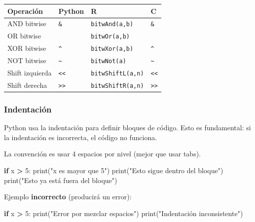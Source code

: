 \documentclass[
]{book}
\newenvironment{Shaded}{\begin{snugshade}}{\end{snugshade}}
\newcommand{\BuiltInTok}[1]{#1}
\newcommand{\ControlFlowTok}[1]{\textcolor[rgb]{0.13,0.29,0.53}{\textbf{#1}}}
\newcommand{\DecValTok}[1]{\textcolor[rgb]{0.00,0.00,0.81}{#1}}
\newcommand{\NormalTok}[1]{#1}
\newcommand{\OperatorTok}[1]{\textcolor[rgb]{0.81,0.36,0.00}{\textbf{#1}}}
\newcommand{\StringTok}[1]{\textcolor[rgb]{0.31,0.60,0.02}{#1}}
\newcounter{none} %
\theoremstyle{break}
\theoremstyle{nonumberplain}
\begin{document}
{\def\LTcaptype{none} %
\begin{longtable}[]{@{}llll@{}}
\toprule\noalign{}
Operación & Python & R & C \\
\midrule\noalign{}
\endhead
\bottomrule\noalign{}
\endlastfoot
AND bitwise & \texttt{\&} & \texttt{bitwAnd(a,b)} & \texttt{\&} \\
OR bitwise & \texttt{\textbar{}} & \texttt{bitwOr(a,b)} & \texttt{\textbar{}} \\
XOR bitwise & \texttt{\^{}} & \texttt{bitwXor(a,b)} & \texttt{\^{}} \\
NOT bitwise & \texttt{\textasciitilde{}} & \texttt{bitwNot(a)} & \texttt{\textasciitilde{}} \\
Shift izquierda & \texttt{\textless{}\textless{}} & \texttt{bitwShiftL(a,n)} & \texttt{\textless{}\textless{}} \\
Shift derecha & \texttt{\textgreater{}\textgreater{}} & \texttt{bitwShiftR(a,n)} & \texttt{\textgreater{}\textgreater{}} \\
\end{longtable}
}

\subsubsection{Indentación}\label{indentaciuxf3n}

Python usa la indentación para definir bloques de código.
Esto es fundamental: si la indentación es incorrecta, el código no funciona.

La convención es usar 4 espacios por nivel (mejor que usar tabs).

\begin{Shaded}
\begin{Highlighting}[]
\ControlFlowTok{if}\NormalTok{ x }\OperatorTok{\textgreater{}} \DecValTok{5}\NormalTok{:}
    \BuiltInTok{print}\NormalTok{(}\StringTok{"x es mayor que 5"}\NormalTok{)}
    \BuiltInTok{print}\NormalTok{(}\StringTok{"Esto sigue dentro del bloque"}\NormalTok{)}
\BuiltInTok{print}\NormalTok{(}\StringTok{"Esto ya está fuera del bloque"}\NormalTok{)}
\end{Highlighting}
\end{Shaded}

Ejemplo \textbf{incorrecto} (producirá un error):

\begin{Shaded}
\begin{Highlighting}[]
\ControlFlowTok{if}\NormalTok{ x }\OperatorTok{\textgreater{}} \DecValTok{5}\NormalTok{:}
  \BuiltInTok{print}\NormalTok{(}\StringTok{"Error por mezclar espacios"}\NormalTok{)}
    \BuiltInTok{print}\NormalTok{(}\StringTok{"Indentación inconsistente"}\NormalTok{)}
\end{Highlighting}
\end{Shaded}
\end{document}
